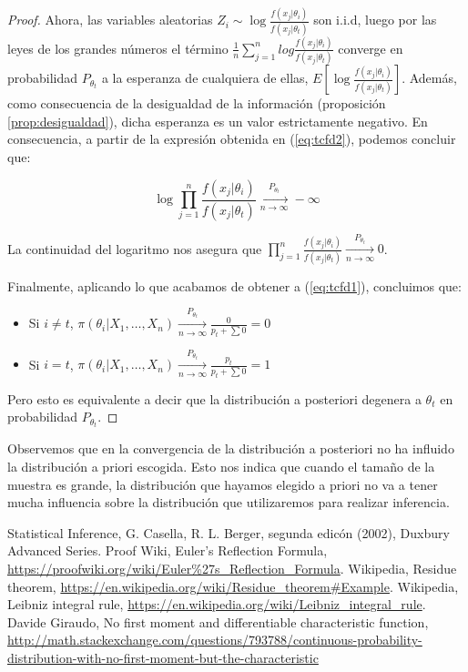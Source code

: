 \documentclass{article}
\begin{document}
\begin{proof}
	Ahora, las variables aleatorias $Z_i \sim \log{\frac{f(x_j|\theta_i)}{f(x_j|\theta_t)}}$ son i.i.d, luego por las leyes de los grandes números el término $\frac{1}{n}\sum_{j=1}^{n}{log{\frac{f(x_j|\theta_i)}{f(x_j|\theta_t)}}}$ converge en probabilidad $P_{\theta_t}$ a la esperanza de cualquiera de ellas, $E\left[\log{\frac{f(x_j|\theta_i)}{f(x_j|\theta_t)}}\right]$. Además, como consecuencia de la desigualdad de la información (proposición \ref{prop:desigualdad}), dicha esperanza es un valor estrictamente negativo. En consecuencia, a partir de la expresión obtenida en (\ref{eq:tcfd2}), podemos concluir que:

	\[\log{\prod_{j=1}^n{\frac{f(x_j|\theta_i)}{f(x_j|\theta_t)}}} \xrightarrow[n\to\infty]{P_{\theta_t}} -\infty\]

	La continuidad del logaritmo nos asegura que $\prod_{j=1}^n{\frac{f(x_j|\theta_i)}{f(x_j|\theta_t)}} \xrightarrow[n\to\infty]{P_{\theta_t}} 0$.

	Finalmente, aplicando lo que acabamos de obtener a (\ref{eq:tcfd1}), concluimos que:

	\begin{itemize}
		\item Si $i \ne t$, $\pi(\theta_i|X_1,\dots,X_n) \xrightarrow[n\to\infty]{P_{\theta_t}} \frac{0}{p_t+\sum{0}} = 0$
		\item Si $i = t$, $\pi(\theta_i|X_1,\dots,X_n) \xrightarrow[n\to\infty]{P_{\theta_t}} \frac{p_t}{p_t+\sum{0}} = 1$
	\end{itemize}

	Pero esto es equivalente a decir que la distribución a posteriori degenera a $\theta_t$ en probabilidad $P_{\theta_t}$.
\end{proof}

\begin{remark}
	Observemos que en la convergencia de la distribución a posteriori no ha influido la distribución a priori escogida. Esto nos indica que cuando el tamaño de la muestra es grande, la distribución que hayamos elegido a priori no va a tener mucha influencia sobre la distribución que utilizaremos para realizar inferencia.
\end{remark}


\pagebreak
\begin{thebibliography}{99}
 Statistical Inference, G. Casella, R. L. Berger, segunda edicón (2002), Duxbury Advanced Series.
 Proof Wiki, Euler's Reflection Formula, \url{https://proofwiki.org/wiki/Euler%27s_Reflection_Formula}.
 Wikipedia, Residue theorem, \url{https://en.wikipedia.org/wiki/Residue_theorem#Example}.
 Wikipedia, Leibniz integral rule, \url{https://en.wikipedia.org/wiki/Leibniz_integral_rule}.
 Davide Giraudo, No first moment and differentiable characteristic function, \url{http://math.stackexchange.com/questions/793788/continuous-probability-distribution-with-no-first-moment-but-the-characteristic}
\end{thebibliography}
\end{document}
